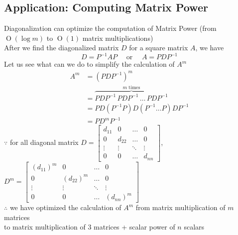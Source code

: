 \documentclass[11pt]{article}
\newcommand{\mymat}[1]{#1}
\begin{document}
    \subsection{Application: Computing Matrix Power}
    Diagonalization can optimize the computation of Matrix Power (from $\operatorname{O}(\log m)$ to $\operatorname{O}(1)$ matrix multiplications) \vspace{1ex} \\
    After we find the diagonalized matrix $\mymat{D}$ for a square matrix $\mymat{A}$, we have
    \begin{equation*}
        \mymat{D} = \mymat{P}^{-1} \mymat{A} \mymat{P} \quad\text{ or }\quad \mymat{A} = \mymat{P} \mymat{D} \mymat{P}^{-1}
    \end{equation*}
    Let us see what can we do to simplify the calculation of $\mymat{A}^m$
    \begin{align*}
        \mymat{A}^m &= (\mymat{P} \mymat{D} \mymat{P}^{-1})^m \\
        &= \overbrace{\mymat{P} \mymat{D} \mymat{P}^{-1}\,\mymat{P} \mymat{D} \mymat{P}^{-1}\,\dots\,\mymat{P} \mymat{D} \mymat{P}^{-1}}^{m\text{ times}} \\
        &= \mymat{P} \mymat{D} (\mymat{P}^{-1}\mymat{P}) \mymat{D} (\mymat{P}^{-1} \dots \mymat{P})\mymat{D}\mymat{P}^{-1} \\
        &= \mymat{P} \mymat{D}^m \mymat{P}^{-1}
    \end{align*}
    $\because$ for all diagonal matrix $\mymat{D} = \begin{bmatrix}
            d_{11}  & 0         & \dots     & 0 \\
            0       & d_{22}    & \dots     & 0 \\
            \vdots  & \vdots    & \ddots    & \vdots \\
            0       & 0         & \dots     & d_{nn}
        \end{bmatrix}$, $\mymat{D}^m = \begin{bmatrix}
            (d_{11})^m  & 0             & \dots     & 0 \\
            0           & (d_{22})^m    & \dots     & 0 \\
            \vdots      & \vdots        & \ddots    & \vdots \\
            0           & 0             & \dots     & (d_{nn})^m
        \end{bmatrix}$\\
    $\therefore$ we have optimized the calculation of $\mymat{A}^m$ from matrix multiplication of $m$ matrices \\
    to matrix multiplication of 3 matrices + scalar power of $n$ scalars
\end{document}
